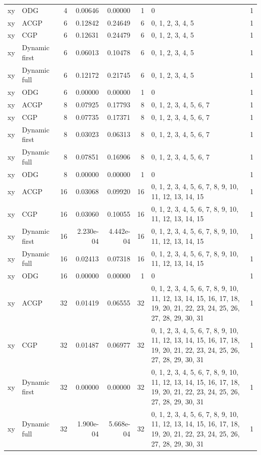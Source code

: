 \documentclass[10pt,a4paper]{article}
\begin{document}
\begin{longtable}{@{}p{23mm}p{29mm}rrrrp{36mm}r@{}}
xy & ODG & 4 & 0.00646 & 0.00000 & 1 & 0 & 1 \\
xy & ACGP & 6 & 0.12842 & 0.24649 & 6 & 0, 1, 2, 3, 4, 5 & 1 \\
xy & CGP & 6 & 0.12631 & 0.24479 & 6 & 0, 1, 2, 3, 4, 5 & 1 \\
xy & Dynamic first & 6 & 0.06013 & 0.10478 & 6 & 0, 1, 2, 3, 4, 5 & 1 \\
xy & Dynamic full & 6 & 0.12172 & 0.21745 & 6 & 0, 1, 2, 3, 4, 5 & 1 \\
xy & ODG & 6 & 0.00000 & 0.00000 & 1 & 0 & 1 \\
xy & ACGP & 8 & 0.07925 & 0.17793 & 8 & 0, 1, 2, 3, 4, 5, 6, 7 & 1 \\
xy & CGP & 8 & 0.07735 & 0.17371 & 8 & 0, 1, 2, 3, 4, 5, 6, 7 & 1 \\
xy & Dynamic first & 8 & 0.03023 & 0.06313 & 8 & 0, 1, 2, 3, 4, 5, 6, 7 & 1 \\
xy & Dynamic full & 8 & 0.07851 & 0.16906 & 8 & 0, 1, 2, 3, 4, 5, 6, 7 & 1 \\
xy & ODG & 8 & 0.00000 & 0.00000 & 1 & 0 & 1 \\
xy & ACGP & 16 & 0.03068 & 0.09920 & 16 & 0, 1, 2, 3, 4, 5, 6, 7, 8, 9, 10, 11, 12, 13, 14, 15 & 1 \\
xy & CGP & 16 & 0.03060 & 0.10055 & 16 & 0, 1, 2, 3, 4, 5, 6, 7, 8, 9, 10, 11, 12, 13, 14, 15 & 1 \\
xy & Dynamic first & 16 & 2.230e-04 & 4.442e-04 & 16 & 0, 1, 2, 3, 4, 5, 6, 7, 8, 9, 10, 11, 12, 13, 14, 15 & 1 \\
xy & Dynamic full & 16 & 0.02413 & 0.07318 & 16 & 0, 1, 2, 3, 4, 5, 6, 7, 8, 9, 10, 11, 12, 13, 14, 15 & 1 \\
xy & ODG & 16 & 0.00000 & 0.00000 & 1 & 0 & 1 \\
xy & ACGP & 32 & 0.01419 & 0.06555 & 32 & 0, 1, 2, 3, 4, 5, 6, 7, 8, 9, 10, 11, 12, 13, 14, 15, 16, 17, 18, 19, 20, 21, 22, 23, 24, 25, 26, 27, 28, 29, 30, 31 & 1 \\
xy & CGP & 32 & 0.01487 & 0.06977 & 32 & 0, 1, 2, 3, 4, 5, 6, 7, 8, 9, 10, 11, 12, 13, 14, 15, 16, 17, 18, 19, 20, 21, 22, 23, 24, 25, 26, 27, 28, 29, 30, 31 & 1 \\
xy & Dynamic first & 32 & 0.00000 & 0.00000 & 32 & 0, 1, 2, 3, 4, 5, 6, 7, 8, 9, 10, 11, 12, 13, 14, 15, 16, 17, 18, 19, 20, 21, 22, 23, 24, 25, 26, 27, 28, 29, 30, 31 & 1 \\
xy & Dynamic full & 32 & 1.900e-04 & 5.668e-04 & 32 & 0, 1, 2, 3, 4, 5, 6, 7, 8, 9, 10, 11, 12, 13, 14, 15, 16, 17, 18, 19, 20, 21, 22, 23, 24, 25, 26, 27, 28, 29, 30, 31 & 1 \\

\end{longtable}
\end{document}
